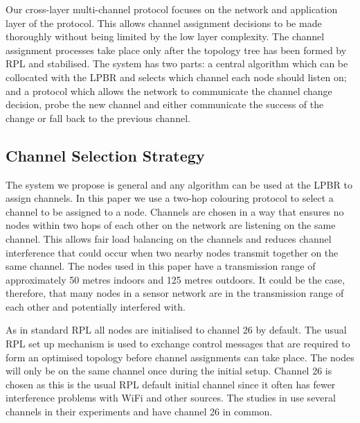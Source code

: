 Our cross-layer multi-channel protocol focuses on the network and application layer of the protocol. This allows channel assignment decisions to be made thoroughly without being limited by the low layer complexity. The channel assignment processes take place only after the topology tree has been formed by RPL and stabilised. The system
has two parts: a central algorithm which can be collocated with the LPBR and selects which channel each node should listen on; and a protocol which allows the network to communicate the channel change decision, probe the new channel and either communicate the success of the change or fall back to the previous channel. 



\subsection{Channel Selection Strategy}

The system we propose is general and any algorithm can be used at the LPBR to assign channels. In this paper we
use a two-hop colouring protocol to select a channel to be assigned to a node. Channels are chosen in a way that
ensures no nodes within two hops of each other on the network are listening on the same channel.
This allows fair load balancing on the channels and reduces channel interference that could occur when two nearby nodes transmit together on the same channel. The nodes used in this paper have a transmission range of approximately 50 metres indoors and 125 metres outdoors. It could be the case, therefore, that many nodes in a sensor network are in the transmission range of each other and potentially interfered with.

As in standard RPL all nodes are initialised to channel 26 by default. The usual RPL set up mechanism is used to exchange control messages that are required to form an optimised topology before channel assignments can take place. The nodes will only be on the same channel once during the initial setup. Channel 26 is chosen as this is the usual RPL default initial channel since it often has fewer interference problems with WiFi and other sources. The studies in \cite{chrysso, micmac, watteyne} use several channels in their experiments and have channel 26 in common.
	
